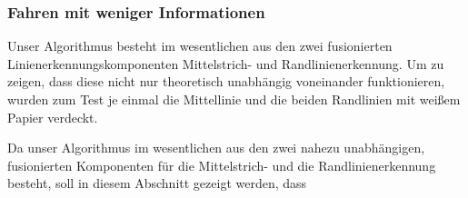 \subsubsection{Fahren mit weniger Informationen \dcfirstauthorshort}

Unser Algorithmus besteht im wesentlichen aus den zwei fusionierten Linienerkennungskomponenten Mittelstrich- und Randlinienerkennung. Um zu zeigen, dass diese nicht nur theoretisch unabhängig voneinander funktionieren, wurden zum Test je einmal die Mittellinie und die beiden Randlinien mit weißem Papier verdeckt. 

Da unser Algorithmus im wesentlichen aus den zwei nahezu unabhängigen, fusionierten Komponenten für die Mittelstrich- und die Randlinienerkennung besteht, soll in diesem Abschnitt gezeigt werden, dass 
